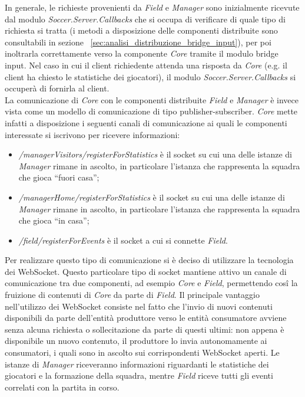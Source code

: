 In generale, le richieste provenienti da \emph{Field} e \emph{Manager} sono inizialmente ricevute dal modulo \emph{Soccer.Server.Callbacks} che si occupa di verificare di quale tipo di richiesta si tratta (i metodi a disposizione delle componenti distribuite sono consultabili in sezione ~\ref{sec:analisi_distribuzione_bridge_input}), per poi inoltrarla correttamente verso la componente \emph{Core} tramite il modulo bridge input. Nel caso in cui il client richiedente attenda una risposta da \emph{Core} (e.g. il client ha chiesto le statistiche dei giocatori), il modulo \emph{Soccer.Server.Callbacks} si occuper\`{a} di fornirla al client.\\

La comunicazione di \emph{Core} con le componenti distribuite \emph{Field} e \emph{Manager} è invece vista come un modello di comunicazione di tipo publisher-subscriber. \emph{Core} mette infatti a disposizione i seguenti canali di comunicazione ai quali le componenti interessate si iscrivono per ricevere informazioni:

\begin{itemize}
	\item \emph{/managerVisitors/registerForStatistics} \`{e} il socket su cui una delle istanze di \emph{Manager} rimane in ascolto, in particolare l'istanza che rappresenta la squadra che gioca ``fuori casa'';
	\item \emph{/managerHome/registerForStatistics} \`{e} il socket su cui una delle istanze di \emph{Manager} rimane in ascolto, in particolare l'istanza che rappresenta la squadra che gioca ``in casa'';
	\item \emph{/field/registerForEvents} \`{e} il socket a cui si connette \emph{Field}.
\end{itemize}

Per realizzare questo tipo di comunicazione si è deciso di utilizzare la tecnologia dei WebSocket. Questo particolare tipo di socket mantiene attivo un canale di comunicazione tra due componenti, ad esempio \emph{Core} e \emph{Field}, permettendo cosî la fruizione di contenuti di \emph{Core} da parte di \emph{Field}. Il principale vantaggio nell'utilizzo dei WebSocket consiste nel fatto che l'invio di nuovi contenuti disponibili da parte dell'entità produttore verso le entità consumatore avviene senza alcuna richiesta o sollecitazione da parte di questi ultimi: non appena è disponibile un nuovo contenuto, il produttore lo invia autonomamente ai consumatori, i quali sono in ascolto sui corrispondenti WebSocket aperti. Le istanze di \emph{Manager} riceveranno informazioni riguardanti le statistiche dei giocatori e la formazione della squadra, mentre \emph{Field} riceve tutti gli eventi correlati con la partita in corso.\\

